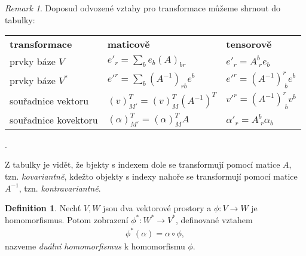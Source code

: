 \documentclass[a4paper,11pt]{article}
\theoremstyle{theorem}
\theoremstyle{remark}
\newtheorem*{remark}{Remark}
\theoremstyle{definition}
\newtheorem{definition}{Definition}[section]
\begin{document}
	\begin{remark}
		Doposud odvozené vztahy pro transformace můžeme shrnout do tabulky:
		\begin{center}
			\begin{tabular}{m{4cm} m{4cm} m{4cm}}
				\textbf{transformace} & \textbf{maticově} & \textbf{tensorově} \\
				prvky báze $V$ & $e'_r = \sum_b e_b (A)_{br}$ & $e'_r = A^b_{\; r} e_b$ \\
				prvky báze $V^*$ & $e'^r = \sum_b (A^{-1})_{rb} e^b$ & $e'^r = (A^{-1})^r_{\; b} e^b$ \\
				souřadnice vektoru & $(v)^T_{M'} = (v)^T_M (A^{-1})^T$ & $v'^r = (A^{-1})^r_{\; b} v^b$ \\
				souřadnice kovektoru & $(\alpha)^T_{M'} = (\alpha)^T_M A$ & $\alpha'_r = A^b_{\; r} \alpha_b$
			\end{tabular}.
		\end{center}
		Z tabulky je vidět, že bjekty s indexem dole se transformují pomocí matice $A$, tzn. \textit{kovariantně}, kdežto objekty s indexy nahoře se transformují pomocí matice $A^{-1}$, tzn. \textit{kontravariantně}.
	\end{remark}
	
	\begin{definition}
		Nechť $V, W$ jsou dva vektorové prostory a $\phi: V \to W$ je homomorfismus. Potom zobrazení $\phi^*: W^* \to V^*$, definované vztahem
		\begin{align}
			\phi^*(\alpha) = \alpha \circ \phi,
		\end{align}
		nazveme \textit{duální homomorfismus} k homomorfismu $\phi$.
	\end{definition}
	
\end{document}
